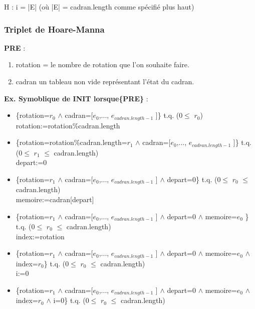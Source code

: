 \documentclass[a4paper, 12pt]{article}
\begin{document}
H : i = |E| (où |E| = cadran.length comme spécifié plus haut)

\subsubsection{Triplet de Hoare-Manna}

\textbf{PRE} :
\begin{enumerate}
 \item rotation = le nombre de rotation que l'on souhaite faire. 
 \item cadran un tableau non vide représentant l'état du cadran.
\end{enumerate}

\vspace{0.2cm}

\textbf{Ex. Symoblique de INIT lorsque\{PRE\}} :

\begin{itemize}
\item \{rotation=$r_{0}$ $\wedge$ cadran=[$e_{0}$,..., $e_{cadran.length-1}$ ]\} t.q. (0$\le$ $r_{0}$)\\

rotation:=rotation\%cadran.length\\

\item \{rotation=rotation\%cadran.length=$r_{1}$ $\wedge$ cadran=[$e_{0}$,..., $e_{cadran.length-1}$ ]\} t.q. (0$\le$ $r_{1}$ $\le$ cadran.length)\\ 

depart:=0\\

\item \{rotation=$r_{1}$ $\wedge$ cadran=[$e_{0}$,..., $e_{cadran.length-1}$ ] $\wedge$ depart=0\} t.q. (0$\le$ $r_{0}$ $\le$ cadran.length)\\

memoire:=cadran[depart]\\

\item \{rotation=$r_{1}$ $\wedge$ cadran=[$e_{0}$,..., $e_{cadran.length-1}$ ] $\wedge$ depart=0 $\wedge$ memoire=$e_{0}$ \} t.q. (0$\le$ $r_{0}$ $\le$ cadran.length)\\

index:=rotation

\item \{rotation=$r_{1}$ $\wedge$ cadran=[$e_{0}$,..., $e_{cadran.length-1}$ ] $\wedge$ depart=0 $\wedge$ memoire=$e_{0}$ $\wedge$ index=$r_{0}$\} t.q. (0$\le$ $r_{0}$ $\le$ cadran.length)\\

i:=0\\

\item \{rotation=$r_{1}$ $\wedge$ cadran=[$e_{0}$,..., $e_{cadran.length-1}$ ] $\wedge$ depart=0 $\wedge$ memoire=$e_{0}$ $\wedge$ index=$r_{0}$ $\wedge$ i=0\} t.q. (0$\le$ $r_{0}$ $\le$ cadran.length)\\
\end{itemize}
\end{document}
